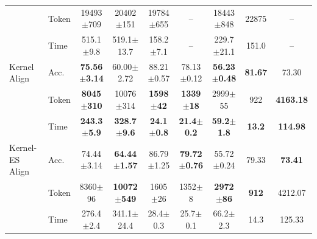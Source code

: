 \documentclass{article} %
\begin{document}
\begin{table}[t]
{{\begin{tabular}{@{}ll*{7}{c}@{}}
 & Token & 19493$\pm$709 & 20402$\pm$151 & 19784$\pm$655 & -- & 18443$\pm$848 & 22875 & -- \\
 & Time & 515.1$\pm$9.8 & 519.1$\pm$13.7 & 158.2$\pm$7.1 & -- & 229.7$\pm$21.1 & 151.0 & -- \\
\midrule
Kernel Align & Acc. & \textbf{75.56$\pm$3.14} & 60.00$\pm$2.72 & 88.21$\pm$0.57 & 78.13$\pm$0.12 & \textbf{56.23$\pm$0.48} & \textbf{81.67} & 73.30 \\
 & Token & \textbf{8045$\pm$310} & 10076$\pm$314 & \textbf{1598$\pm$42} & \textbf{1339$\pm$18} & 2999$\pm$55 & 922 & \textbf{4163.18} \\
 & Time & \textbf{243.3$\pm$5.9} & \textbf{328.7$\pm$9.6} & \textbf{24.1$\pm$0.8} & \textbf{21.4$\pm$0.2} & \textbf{59.2$\pm$1.8} & \textbf{13.2} & \textbf{114.98} \\
\midrule
Kernel-ES Align & Acc. & 74.44$\pm$3.14 & \textbf{64.44$\pm$1.57} & 86.79$\pm$1.25 & \textbf{79.72$\pm$0.76} & 55.72$\pm$0.24 & 79.33 & \textbf{73.41} \\
 & Token & 8360$\pm$96 & \textbf{10072$\pm$549} & 1605$\pm$26 & 1352$\pm$8 & \textbf{2972$\pm$86} & \textbf{912} & 4212.07 \\
 & Time & 276.4$\pm$2.4 & 341.1$\pm$24.4 & 28.4$\pm$0.3 & 25.7$\pm$0.1 & 66.2$\pm$2.3 & 14.3 & 125.33 \\
\bottomrule
\end{tabular}%
}%
}
\end{table}
\end{document}
